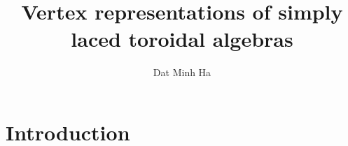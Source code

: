 

\setcounter{section}{-1}


\newcommand{\simpleroots}{\mathbb{I}}
\newcommand{\toroidal}{\t}
\newcommand{\Yangian}{\rmY}
\newcommand{\YangianDouble}{\rmD\rmY}
\newcommand{\extendedYangianDouble}{\widetilde{\rmD\rmY}}



    \title{Vertex representations of simply laced toroidal algebras}
    
    \author{Dat Minh Ha}
    \maketitle
    
    \begin{abstract}
        
    \end{abstract}
    
    {
    \hypersetup{} 
    \tableofcontents %
    }

    \section{Introduction}

    

    
    
    \printbibliography

